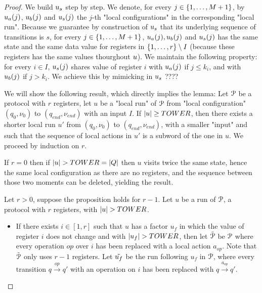 \begin{proof}
We build $u_s$ step by step. We denote, for every $j \in \{1,\dots,M+1\}$, by $u_a(j)$, $u_b(j)$ and $u_s(j)$ the $j$-th "local configurations" in the corresponding "local run". Because we guarantee by construction of $u_s$ that its underlying sequence of transitions is $s$, for every $j \in \{1,\dots,M+1\}$, $u_a(j), u_b(j)$ and $u_s(j)$ has the same state and the same data value for registers in $\{1,\dots,r\} \setminus I$ (because these registers has the same values thourghout $u$).
 We maintain the following property: for every $i \in I$, $u_s(j)$ shares value of register $i$ with $u_a(j)$ if $j \leq k_i$, and with $u_b(j)$ if $j > k_i$. We achieve this by mimicking in $u_s$ ????
















	We will show the following result, which directly implies the lemma:
	Let $\mathcal{P}$ be a protocol with $r$ registers, let $u$ be a "local run" of $\mathcal{P}$ from "local configuration" $(q_0, \nu_0)$ to $(q_{end}, \nu_{end})$ with an input $I$. If $|u| \geq TOWER$, then there exists a shorter local run $u'$ from $(q_0, \nu_0)$ to $(q_{end}, \nu_{end})$, with a smaller "input" and such that the sequence of local actions in $u'$ is a subword of the one in $u$.
	We proceed by induction on $r$.
	
	If $r=0$ then if $|u| > TOWER = |Q|$ then $u$ visits twice the same state, hence the same local configuration as there are no registers, and the sequence between those two moments can be deleted, yielding the result.
	
	Let $r>0$, suppose the proposition holds for $r-1$.
	Let $u$ be a run of $\mathcal{P}$, a protocol with $r$ registers, with $|u| > TOWER$.
	
	\begin{itemize}
		\item If there exists $i \in [1,r]$ such that $u$ has a factor $u_f$ in which the value of register $i$ does not change and with $|u_f| > TOWER$, then let $\Tilde{\mathcal{P}}$ be $\mathcal{P}$ where every operation $op$ over $i$ has been replaced with a local action $a_{op}$. Note that $\Tilde{\mathcal{P}}$ only uses $r-1$ registers. 
		Let $\Tilde{u_f}$ be the run following $u_f$ in $\mathcal{P}$, where every transition $q \xrightarrow{op} q'$ with an operation on $i$ has been replaced with $q \xrightarrow{a_{op}} q'$.
		

\end{itemize}
\end{proof}
